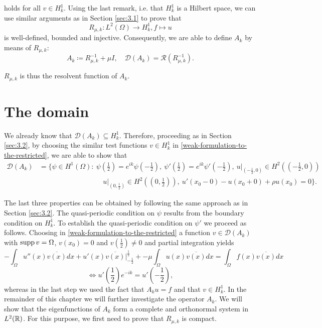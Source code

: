 holds for all $v \in H^{1}_{k}$. Using the last remark, i.e. that $H^{1}_{k}$ is a Hilbert space, we can use similar arguments as in Section \ref{sec:3.1} to prove that 
	\[ R_{\mu, k} \colon L^{2}(\Omega) \rightarrow H^{1}_{k},  f \mapsto u \]
is well-defined, bounded and injective. Consequently, we are able to define $A_{k}$ by means of $R_{\mu, k}$:
	\[ A_{k} \coloneqq R_{\mu, k}^{-1} + \mu I, \quad \mathcal{D}(A_{k}) = \mathcal{R}(R_{\mu, k}^{-1}). \] 
	
\begin{remark}
	$R_{\mu, k}$ is thus the resolvent function of $A_{k}$.
\end{remark}

\section{The domain} \label{sec:4.1}

We already know that $\mathcal{D}(A_{k}) \subseteq H^{1}_{k}$. Therefore, proceeding as in Section \ref{sec:3.2}, by choosing the similar test functions $v \in H^{1}_{k}$ in \eqref{weak-formulation-to-the-restricted}, we are able to show that
\begin{align*}
	\mathcal{D}(A_{k}) & = \Big\{ \psi \in H^{1}(\Omega) \colon ~\psi\left(\frac{1}{2}\right) = e^{ik} \psi\left(-\frac{1}{2}\right), ~ \psi'\left(\frac{1}{2}\right) = e^{ik} \psi'\left(-\frac{1}{2}\right), ~ u\big|_{\left(-\frac{1}{2}, 0\right)} \in H^{2}\left(\left(-\frac{1}{2}, 0\right)\right) \\	
	 & ~\qquad ~\qquad ~\qquad ~\qquad ~ u\big|_{\left(0, \frac{1}{2}\right)} \in H^{2}\left(\left(0, \frac{1}{2}\right)\right), ~ u'(x_{0}-0) - u(x_{0} + 0) + \rho u(x_{0}) = 0 \Big\}. 
\end{align*}

The last three properties can be obtained by following the same approach as in Section \ref{sec:3.2}. The quasi-periodic condition on $\psi$ results from the boundary condition on $H^{1}_{k}$. To establish the quasi-periodic condition on $\psi'$ we proceed as follows. Choosing in \eqref{weak-formulation-to-the-restricted} a function $v \in \mathcal{D}(A_{k})$ with $\operatorname{supp} v = \Omega$, $v\left(x_{0}\right) = 0$ and $v\left(\frac{1}{2}\right) \neq 0$ and partial integration yields
\[ - \int_{\Omega} u''(x) \overline{v(x)} dx +  u'(x) \overline{v(x)} \big|_{-\frac{1}{2}}^{\frac{1}{2}} + - \mu \int_{\Omega} u(x) \overline{v(x)} dx = \int_{\Omega} f(x) \overline{v(x)} dx \] 
\[ \iff u'\left(\frac{1}{2}\right) e^{-ik} = u'\left(-\frac{1}{2}\right), \] 
whereas in the last step we used the fact that $A_{k} u = f$ and that $v \in H^{1}_{k}$. In the remainder of this chapter we will further investigate the operator $A_{k}$. We will show that the eigenfunctions of $A_{k}$ form a complete and orthonormal system in $L^{2}(\mathbb{R})$. For this purpose, we first need to prove that $R_{\mu, k}$ is compact.

